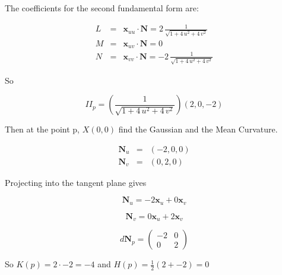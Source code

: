 \begin{example}
The coefficients for the second fundamental form are:

\begin{eqnarray}
\nonumber
L &=& \mathbf x_{uu} \cdot \mathbf N = 2\,{\frac {1}{\sqrt {1+4\,{u}^{2}+4\,{v}^{2}}}}\\
\nonumber
M &=& \mathbf x_{uv} \cdot \mathbf N = 0\\
\nonumber
N &=& \mathbf x_{vv} \cdot \mathbf N = -2\,{\frac {1}{\sqrt {1+4\,{u}^{2}+4\,{v}^{2}}}}
\end{eqnarray}

So

\begin{displaymath}
II_p = ({\frac {1}{\sqrt {1+4\,{u}^{2}+4\,{v}^{2}}}})(2,0,-2)
\end{displaymath}

Then at the point p, $X(0,0)$ find the Gaussian and the Mean Curvature.

\begin{eqnarray}
\nonumber
\mathbf N_u &=& (-2,0,0) \\
\nonumber
\mathbf N_v &=& (0,2,0)
\end{eqnarray}

Projecting into the tangent plane gives

\begin{displaymath}
\mathbf N_u = -2 \mathbf x_u + 0 \mathbf x_v
\end{displaymath}

\begin{displaymath}
\mathbf N_v = 0 \mathbf x_u + 2 \mathbf x_v
\end{displaymath}

\begin{displaymath}
d\mathbf N_p =
\left( \begin{array}{cc}
-2 & 0 \\
0 & 2
\end{array} \right)
\end{displaymath}

So $ K(p) = 2 \cdot -2 = -4 $ and $H(p) = \frac{1}{2}(2 + -2) = 0$
\end{example}
\newpage

